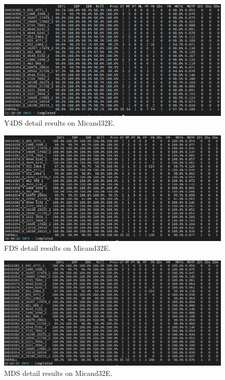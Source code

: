 \begin{figure}
	\centerline{\includegraphics[width=1\linewidth]{Figs/Evaluation/micand26/y4ds.png}}
	\caption{Y4DS detail results on Micand32E.}
	\label{fig:y4ds_short}
\end{figure}
\begin{figure}
	\centerline{\includegraphics[width=1\linewidth]{Figs/Evaluation/micand26/fds.png}}
	\caption{FDS detail results on Micand32E.}
\end{figure}
\begin{figure}
	\centerline{\includegraphics[width=1\linewidth]{Figs/Evaluation/micand26/mds.png}}
	\caption{MDS detail results on Micand32E.}
\end{figure}
